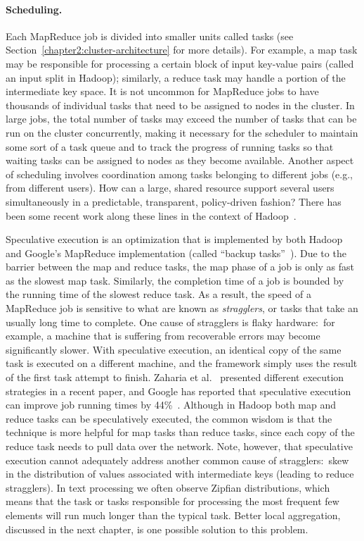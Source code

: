 \paragraph{Scheduling.} Each MapReduce job is divided into smaller
units called tasks (see Section~\ref{chapter2:cluster-architecture}
for more details).  For example, a map task may be responsible for
processing a certain block of input key-value pairs (called an input
split in Hadoop); similarly, a reduce task may handle a portion of the
intermediate key space.  It is not uncommon for MapReduce jobs to have
thousands of individual tasks that need to be assigned to nodes in the
cluster.  In large jobs, the total number of tasks may exceed the
number of tasks that can be run on the cluster concurrently, making it
necessary for the scheduler to maintain some sort of a task queue and
to track the progress of running tasks so that waiting tasks can be
assigned to nodes as they become available.  Another aspect of
scheduling involves coordination among tasks belonging to different
jobs (e.g., from different users).  How can a large, shared resource
support several users simultaneously in a predictable, transparent,
policy-driven fashion?  There has been some recent work along these
lines in the context of
Hadoop~\cite{Sandholm_Lai_2009,Zaharia_etal_2009}.

Speculative execution is an optimization that is implemented by both
Hadoop and Google's MapReduce implementation (called ``backup
tasks''~\cite{Dean_Ghemawat_OSDI2004}).  Due to the barrier between
the map and reduce tasks, the map phase of a job is only as fast as
the slowest map task.  Similarly, the completion time of a job is
bounded by the running time of the slowest reduce task.  As a result,
the speed of a MapReduce job is sensitive to what are known as \emph{
stragglers}, or tasks that take an usually long time to complete.  One
cause of stragglers is flaky hardware:\ for example, a machine that is
suffering from recoverable errors may become significantly slower.
With speculative execution, an identical copy of the same task is
executed on a different machine, and the framework simply uses the
result of the first task attempt to finish.  Zaharia et
al.~\cite{Zaharia_etal_OSDI2008} presented different execution
strategies in a recent paper, and Google has reported that speculative
execution can improve job running times by
44\%~\cite{Dean_Ghemawat_OSDI2004}.  Although in Hadoop both map and
reduce tasks can be speculatively executed, the common wisdom is that
the technique is more helpful for map tasks than reduce tasks, since
each copy of the reduce task needs to pull data over the network.
Note, however, that speculative execution cannot adequately address
another common cause of stragglers:\ skew in the distribution of
values associated with intermediate keys (leading to reduce
stragglers).  In text processing we often observe Zipfian
distributions, which means that the task or tasks responsible for
processing the most frequent few elements will run much longer than
the typical task.  Better local aggregation, discussed in the next
chapter, is one possible solution to this problem.

